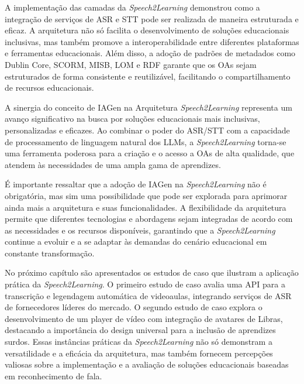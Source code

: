 A implementação das camadas da \textit{Speech2Learning} demonstrou como a integração de serviços de ASR e STT pode ser realizada de maneira estruturada e eficaz. A arquitetura não só facilita o desenvolvimento de soluções educacionais inclusivas, mas também promove a interoperabilidade entre diferentes plataformas e ferramentas educacionais. Além disso, a adoção de padrões de metadados como Dublin Core, SCORM, MISB, LOM e RDF garante que os OAs sejam estruturados de forma consistente e reutilizável, facilitando o compartilhamento de recursos educacionais.

A sinergia do conceito de IAGen na Arquitetura \textit{Speech2Learning} representa um avanço significativo na busca por soluções educacionais mais inclusivas, personalizadas e eficazes. Ao combinar o poder do ASR/STT com a capacidade de processamento de linguagem natural dos LLMs, a \textit{Speech2Learning} torna-se uma ferramenta poderosa para a criação e o acesso a OAs de alta qualidade, que atendem às necessidades de uma ampla gama de aprendizes.

É importante ressaltar que a adoção de IAGen na \textit{Speech2Learning} não é obrigatória, mas sim uma possibilidade que pode ser explorada para aprimorar ainda mais a arquitetura e suas funcionalidades. A flexibilidade da arquitetura permite que diferentes tecnologias e abordagens sejam integradas de acordo com as necessidades e os recursos disponíveis, garantindo que a \textit{Speech2Learning} continue a evoluir e a se adaptar às demandas do cenário educacional em constante transformação.

No próximo capítulo são apresentados os estudos de caso que ilustram a aplicação prática da \textit{Speech2Learning}. O primeiro estudo de caso avalia uma API para a transcrição e legendagem automática de videoaulas, integrando serviços de ASR de fornecedores líderes do mercado. O segundo estudo de caso explora o desenvolvimento de um player de vídeo com integração de avatares de Libras, destacando a importância do design universal para a inclusão de aprendizes surdos. Essas instâncias práticas da \textit{Speech2Learning} não só demonstram a versatilidade e a eficácia da arquitetura, mas também fornecem percepções valiosas sobre a implementação e a avaliação de soluções educacionais baseadas em reconhecimento de fala.